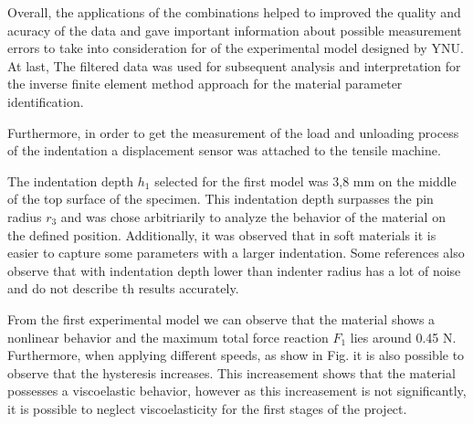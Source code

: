 Overall, the applications of the combinations helped to improved the quality and acuracy 
of the data and gave important information about possible measurement errors to 
take into consideration for of the experimental model 
designed by YNU. At last, The filtered data was used for subsequent analysis and 
interpretation for the inverse finite element method approach for the material parameter 
identification.





Furthermore, in order to get the measurement of the load and 
 unloading process of
 the indentation a displacement sensor was attached to the tensile machine.

 The indentation depth \(h_1\) selected for the first model was 3,8 mm on the middle of the 
 top surface of the specimen. This indentation depth surpasses the pin radius \(r_3\) and 
 was chose arbitriarily to analyze the behavior of the material on the defined position.
 Additionally, it was observed that in soft materials it is easier to capture 
 some parameters with a larger indentation. Some references also observe that with
 indentation depth lower than indenter radius has a lot of noise and do not describe
 th results accurately. %

 From the first experimental model we can observe that the material shows a nonlinear 
 behavior and the maximum total force reaction \(F_1\) lies around 0.45 N. %
 Furthermore, when applying different speeds, as show in Fig. %
 it is also possible to observe that 
 the hysteresis increases. %
This increasement shows that the material possesses a viscoelastic behavior, however
as this increasement is not significantly, it is possible to neglect viscoelasticity for 
the first stages of the project.

